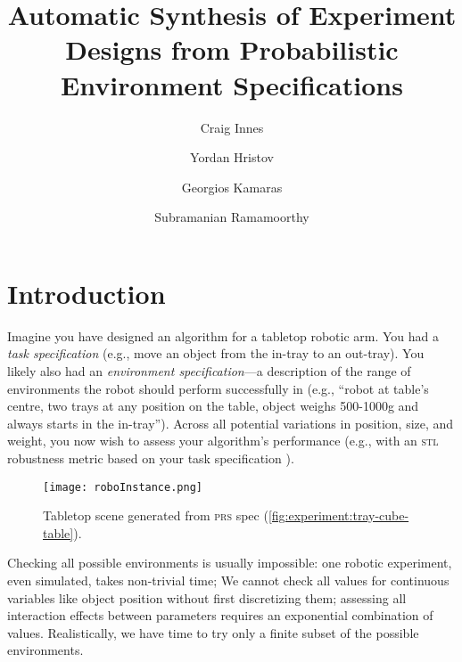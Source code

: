 \documentclass[sigplan, screen]{acmart} %
\title{Automatic Synthesis of Experiment Designs from Probabilistic Environment Specifications}
\author{Craig Innes}
\affiliation{%
\institution{University of Edinburgh}
}
\author{Yordan Hristov}
\affiliation{%
\institution{University of Edinburgh}
}
\author{Georgios Kamaras}
\affiliation{%
\institution{University of Edinburgh}
}
\author{Subramanian Ramamoorthy}
\affiliation{%
\institution{University of Edinburgh}
}
\begin{document}

\maketitle


\section{Introduction}



Imagine you have designed an algorithm for a tabletop robotic arm. You had a \emph{task specification} (e.g., move an object from the in-tray to an out-tray). You likely also had an \emph{environment specification}---a description of the range of environments the robot should perform successfully in (e.g., ``robot at table's centre, two trays at any position on the table, object weighs 500-1000g and always starts in the in-tray''). Across all potential variations in position, size, and weight, you now wish to assess your algorithm's performance (e.g., with an \textsc{stl} robustness metric based on your task specification \cite{mehdipour2019arithmetic,varnai2020robustness,haghighi2019control}).

\begin{figure}
\centering
\texttt{[image: roboInstance.png]}
\caption{Tabletop scene generated from \textsc{prs} spec (\ref{fig:experiment:tray-cube-table}).}
\end{figure}

Checking all possible environments is usually impossible: one robotic experiment, even simulated, takes non-trivial time; We cannot check all values for continuous variables like object position without first discretizing them; assessing all interaction effects between parameters requires an exponential combination of values. Realistically, we have time to try only a finite subset of the possible environments. 
\end{document}
